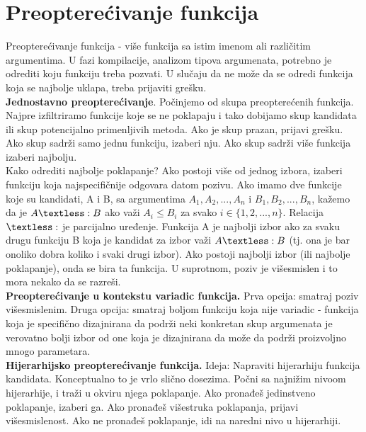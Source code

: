 \documentclass[10pt]{extarticle}
\begin{document}
\section{Preopterećivanje funkcija}
\noindent
Preopterećivanje funkcija - više funkcija sa istim imenom ali različitim argumentima. U fazi kompilacije, analizom tipova argumenata, potrebno je odrediti koju funkciju treba pozvati. U slučaju da ne može da se odredi funkcija koja se najbolje uklapa, treba prijaviti grešku. \\
\textbf{Jednostavno preopterećivanje}. Počinjemo od skupa preopterećenih funkcija. Najpre izfiltriramo funkcije koje se ne poklapaju i tako dobijamo skup kandidata ili skup potencijalno primenljivih metoda. Ako je skup prazan, prijavi grešku. Ako skup sadrži samo jednu funkciju, izaberi nju. Ako skup sadrži više funkcija izaberi najbolju.\\
Kako odrediti najbolje poklapanje? Ako postoji više od jednog izbora, izaberi funkciju koja najspecifičnije odgovara datom pozivu. Ako imamo dve funkcije koje su kandidati, A i B, sa argumentima $A_1, A_2,...,A_n$ i $B_1,B_2,...,B_n$, kažemo da je $A\textless: B$ ako važi $A_i \leq B_i$ za svako $i \in \{1,2,...,n\}$.
Relacija $\textless:$ je parcijalno uređenje. Funkcija A je najbolji izbor ako za svaku drugu funkciju B koja je kandidat za izbor važi $A\textless: B$ (tj. ona je bar onoliko dobra koliko i svaki drugi izbor). Ako postoji najbolji izbor (ili najbolje poklapanje), onda se bira ta funkcija. U suprotnom, poziv je višesmislen i to mora nekako da se razreši. \\
\textbf{Preopterećivanje u kontekstu variadic funkcija.} Prva opcija: smatraj poziv višesmislenim. Druga opcija: smatraj boljom funkciju koja nije variadic - funkcija koja je specifično dizajnirana da podrži neki konkretan skup argumenata je verovatno bolji izbor od one koja je dizajnirana da može da podrži proizvoljno mnogo parametara. \\
\textbf{Hijerarhijsko preopterećivanje funkcija.} Ideja: Napraviti hijerarhiju funkcija kandidata. Konceptualno to je vrlo slično dosezima. Počni sa najnižim nivoom hijerarhije, i traži u okviru njega poklapanje. Ako pronađeš jedinstveno poklapanje, izaberi ga. Ako pronađeš višestruka poklapanja, prijavi višesmislenost. Ako ne pronađeš poklapanje, idi na naredni nivo u hijerarhiji.
\end{document}
